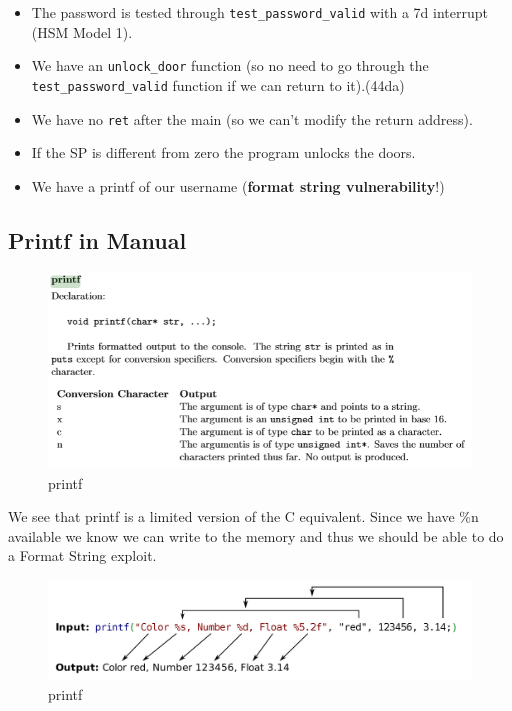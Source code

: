 \documentclass[a4paper,11pt]{article}
\begin{document}
\begin{itemize}
\itemsep1pt\parskip0pt
\item
  The password is tested through \texttt{test\_password\_valid} with a
  7d interrupt (HSM Model 1).
\item
  We have an \texttt{unlock\_door} function (so no need to go through
  the \texttt{test\_password\_valid} function if we can return to
  it).(44da)
\item
  We have no \texttt{ret} after the main (so we can't modify the return
  address).
\item
  If the SP is different from zero the program unlocks the doors.
\item
  We have a printf of our username (\textbf{format string
  vulnerability}!)
\end{itemize}

\subsection{Printf in Manual}\label{printf-in-manual}

\begin{figure}[htbp]
\centering
\includegraphics{img/12_2.PNG}
\caption{printf}
\end{figure}

We see that printf is a limited version of the C equivalent. Since we
have \%n available we know we can write to the memory and thus we should
be able to do a Format String exploit.

\begin{figure}[htbp]
\centering
\includegraphics{img/12_3.PNG}
\caption{printf}
\end{figure}
\end{document}
